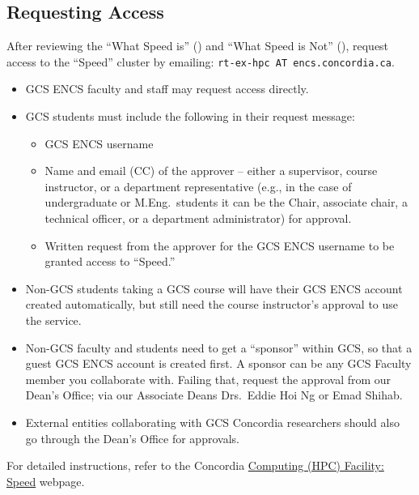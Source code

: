 \subsection{Requesting Access}
\label{sect:access-requests}

After reviewing the ``What Speed is'' () and
``What Speed is Not'' (), request access to the ``Speed''
cluster by emailing: \texttt{rt-ex-hpc AT encs.concordia.ca}.

\begin{itemize}
	\item GCS ENCS faculty and staff may request access directly.
	\item GCS students must include the following in their request message:
	\begin{itemize}
		\item GCS ENCS username
		\item Name and email (CC) of the approver -- either a supervisor, course instructor,
		or a department representative (e.g., in the case of undergraduate or M.Eng.\ students it
		can be the Chair, associate chair, a technical officer, or a department administrator) for approval.
		\item Written request from the approver for the GCS ENCS username to be granted access to ``Speed.''
	\end{itemize}
	\item Non-GCS students taking a GCS course will have their GCS ENCS account created automatically, but still need the course instructor's approval to use the service.
	\item Non-GCS faculty and students need to get a ``sponsor'' within GCS, so that a guest GCS ENCS account is created first. A sponsor can be any GCS Faculty member
	you collaborate with. Failing that, request the approval from our Dean's Office;
	via our Associate Deans Drs.~Eddie Hoi Ng or Emad Shihab.
	\item External entities collaborating with GCS Concordia researchers should also go through the Dean's Office for approvals.
\end{itemize}

For detailed instructions, refer to the Concordia
\href{https://www.concordia.ca/ginacody/aits/speed.html}{Computing (HPC) Facility: Speed} webpage.